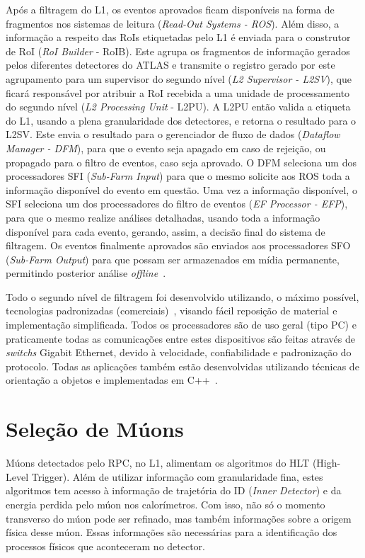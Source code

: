 Após a filtragem do L1, os eventos aprovados ficam disponíveis na forma de
fragmentos nos sistemas de leitura (\emph{Read-Out Systems - ROS}).  Além
disso, a informação a respeito das RoIs etiquetadas pelo L1 é enviada para o
construtor de RoI (\emph{RoI Builder} - RoIB). Este agrupa os fragmentos de
informação gerados pelos diferentes detectores do ATLAS e transmite o registro
gerado por este agrupamento para um supervisor do segundo nível (\emph{L2
Supervisor - L2SV}), que ficará responsável por atribuir a RoI recebida a uma
unidade de processamento do segundo nível  (\emph{L2 Processing Unit} - L2PU).
A L2PU então valida a etiqueta do L1, usando a plena granularidade dos
detectores, e retorna o resultado para o L2SV. Este envia o resultado para o
gerenciador de fluxo de dados (\emph{Dataflow Manager - DFM}), para que o
evento seja apagado em caso de rejeição, ou propagado para o filtro de eventos,
caso seja aprovado.  O DFM seleciona um dos processadores SFI (\emph{Sub-Farm
Input}) para que o mesmo solicite aos ROS toda a informação disponível do
evento em questão. Uma vez a informação disponível, o SFI seleciona um dos
processadores do filtro de eventos (\emph{EF Processor - EFP}), para que o
mesmo realize análises detalhadas, usando toda a informação disponível para
cada evento, gerando, assim, a decisão final do sistema de filtragem. Os
eventos finalmente aprovados são enviados aos processadores SFO (\emph{Sub-Farm
Output}) para que possam ser armazenados em mídia permanente, permitindo
posterior análise \emph{offline}~\cite{RIU2008}.

Todo o segundo nível de filtragem foi desenvolvido utilizando, o máximo
possível, tecnologias padronizadas (comerciais)~\cite{ANJOS2004}, visando
fácil reposição de material e implementação simplificada. Todos os
processadores são de uso geral (tipo PC) e praticamente todas as comunicações
entre estes dispositivos são feitas através de \emph{switchs} Gigabit Ethernet,
devido à velocidade, confiabilidade e padronização do protocolo. Todas as
aplicações também estão desenvolvidas utilizando técnicas de orientação a
objetos e implementadas em C++~\cite{SCHILDT2003}.


\section{Seleção de Múons}

Múons detectados pelo RPC, no L1, alimentam os algoritmos do HLT (High-Level
Trigger). Além de utilizar informação com granularidade fina, estes algoritmos
tem acesso à informação de trajetória do ID (\emph{Inner Detector}) e da energia
perdida pelo múon nos calorímetros. Com isso, não só o momento transverso do
múon pode ser refinado, mas também informações sobre a origem física desse múon.
Essas informações são necessárias para a identificação dos processos físicos que
aconteceram no detector.

